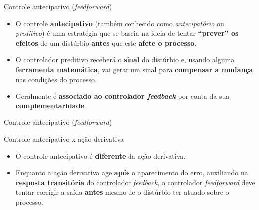 \begin{frame}{Controle antecipativo (\textit{feedforward})}
	\begin{block}{}
		\begin{itemize}
			\item O controle \textbf{antecipativo} (também conhecido como \textit{antecipatório} ou \textit{preditivo}) é uma estratégia que se baseia na ideia de tentar \textbf{``prever'' os efeitos} de um distúrbio \textbf{antes} que este \textbf{afete o processo}.
			\item O controlador preditivo receberá o \textbf{sinal} do distúrbio e, usando alguma \textbf{ferramenta matemática}, vai gerar um sinal para \textbf{compensar a mudança} nas condições do processo.
			\item Geralmente é \textbf{associado ao controlador \textit{feedback}} por conta da sua \textbf{complementaridade}.
		\end{itemize}
	\end{block}


	\centering
\end{frame}


\begin{frame}{Controle antecipativo (\textit{feedforward})}
	\begin{block}{Controle antecipativo x ação derivativa}
		\begin{itemize}
			\item O controle antecipativo é \textbf{diferente} da ação derivativa.
			\item Enquanto a ação derivativa age \textbf{após} o aparecimento do erro, auxiliando na \textbf{resposta transitória} do controlador \textit{feedback}, o controlador \textit{feedforward} deve tentar corrigir a saída \textbf{antes} mesmo de o distúrbio ter atuado sobre o processo.
		\end{itemize}
	\end{block}
\end{frame}


